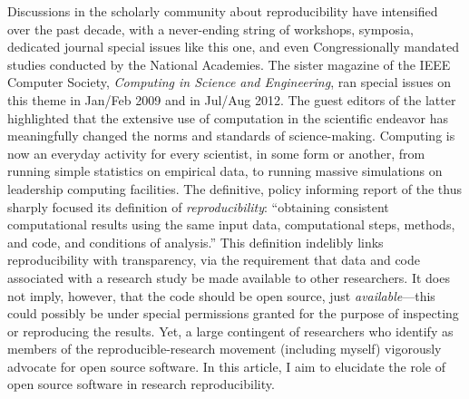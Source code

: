 \documentclass{statement}
\begin{document}
Discussions in the scholarly community about reproducibility have intensified over the past decade, with a never-ending string of workshops, symposia, dedicated journal special issues like this one, and even Congressionally mandated studies conducted by the National Academies. 
The sister magazine of the IEEE Computer Society, \emph{Computing in Science and Engineering}, ran special issues on this theme in Jan/Feb 2009 and in Jul/Aug 2012. 
The guest editors of the latter highlighted that the extensive use of computation in the scientific endeavor has meaningfully changed the norms and standards of science-making. 
Computing is now an everyday activity for every scientist, in some form or another, from running simple statistics on empirical data, to running massive simulations on leadership computing facilities. 
The definitive, policy informing report of the \cite{nasem_2019} thus sharply focused its definition of \emph{reproducibility}: 
``obtaining consistent computational results using the same input data, computational steps, methods, and code, and conditions of analysis.'' 
This definition indelibly links reproducibility with transparency, via the requirement that data and code associated with a research study be made available to other researchers. 
It does not imply, however, that the code should be open source, just \emph{available}---this could possibly be under special permissions granted for the purpose of inspecting or reproducing the results. 
Yet, a large contingent of researchers who identify as members of the reproducible-research movement (including myself) vigorously advocate for open source software. 
In this article, I aim to elucidate the role of open source software in research reproducibility.
\end{document}
